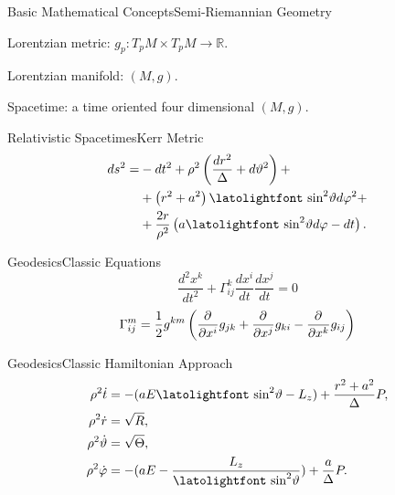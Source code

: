 \begin{frame}{Basic Mathematical Concepts}{Semi-Riemannian Geometry}
	\large
	\begin{fullpageitemize}
		\item Lorentzian metric: $g_p \colon T_pM\times T_pM \to \mathbb{R}$.
		\pause
		\item Lorentzian manifold: $(M,g)$.
		\pause
		\item Spacetime: a time oriented four dimensional $(M,g)$.
	\end{fullpageitemize}
\end{frame}




\begin{frame}{Relativistic Spacetimes}{Kerr Metric}
	{\Large
		\begin{align*}
		ds^2 = &-dt^2 + \rho^2\left(\frac{dr^2}{\Delta} + d\vartheta^2\right) + \\
		&+ \left(r^2 + a^2\right)\textrm{\latolightfont sin}^2\vartheta d\varphi^2 + \\
		\nonumber
		&+ \frac{2r}{\rho^2}\left(a\textrm{\latolightfont sin}^2\vartheta d\varphi - dt\right).
		\end{align*}
	}
\end{frame}




\begin{frame}{Geodesics}{Classic Equations}
	{\Huge
	\[
		\frac{d^2x^k}{dt^2} + \Gamma^k_{ij} \frac{d x^i}{dt} \frac{d x^j}{dt} = 0
	\]}
	\vfill
	\[
		\Gamma^m_{ij} = \frac{1}{2} g^{km} \left( \frac{\partial^{} }{\partial x^i} g_{jk} + \frac{\partial^{} }{\partial x^j} g_{ki} - \frac{\partial^{} }{\partial x^k}g_{ij} \right)	
	\]
\end{frame}

\begin{frame}{Geodesics}{Classic Hamiltonian Approach}
	\large
	\begin{align*}
		\rho^2 \dot{t} &=-( aE\textrm{\latolightfont sin}^2\vartheta - L_z) + \frac{r^2+a^2}{\Delta}P, \\
		\rho^2 \dot{r} &= \sqrt{R}, \\
		\rho^2 \dot{\vartheta} &= \sqrt{\Theta}, \\
		\rho^2 \dot{\varphi} &=-( aE - \frac{L_z}{\textrm{\latolightfont sin}^2\vartheta}) + \frac{a}{\Delta}P.
	\end{align*}
\end{frame}

